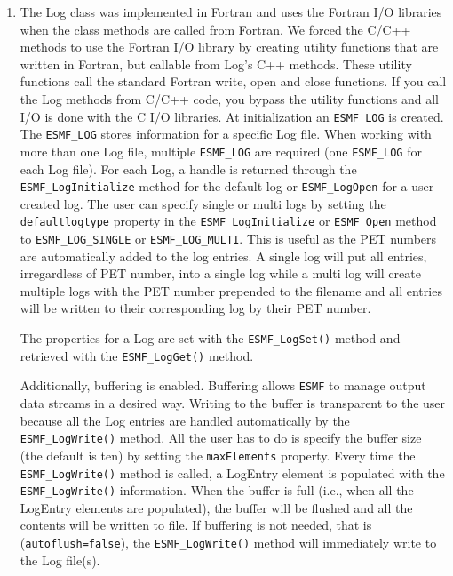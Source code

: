 %
\begin{enumerate}

\item The Log class was implemented in Fortran and uses the Fortran I/O 
libraries when the class methods are called from Fortran. We forced the C/C++
methods to use the Fortran I/O library by creating utility functions that are
written in Fortran, but callable from Log's C++ methods.  These utility 
functions call the standard Fortran write, open and close functions.  If you
call the Log methods from C/C++ code, you bypass the utility functions and 
all I/O is done with the C I/O libraries.
At initialization an {\tt ESMF\_LOG} is created.  The {\tt ESMF\_LOG} stores 
information for a specific Log file.   When working with more than one 
Log file, multiple {\tt ESMF\_LOG} are required (one {\tt ESMF\_LOG} for each 
Log file).  For each Log, a handle is returned through the 
{\tt ESMF\_LogInitialize} method for the default log or {\tt ESMF\_LogOpen} 
for a user created log.  The user can specify single or multi logs by setting
the {\tt defaultlogtype} property in the {\tt ESMF\_LogInitialize} or 
{\tt ESMF\_Open} method to {\tt ESMF\_LOG\_SINGLE} or {\tt ESMF\_LOG\_MULTI}.
This is useful as the PET numbers are automatically added to the log entries.
A single log will put all entries, irregardless of PET number, into a single
log while a multi log will create multiple logs with the PET number prepended
to the filename and all entries will be written to their corresponding log 
by their PET number.

The properties for a Log are set with the {\tt ESMF\_LogSet()} method and 
retrieved with the {\tt ESMF\_LogGet()} method.

Additionally, buffering is enabled.  Buffering allows {\tt ESMF} to manage 
output data streams in a desired way.  Writing to the buffer is transparent 
to the user because all the Log entries are handled automatically by the 
{\tt ESMF\_LogWrite()} method.  All the user has to do is specify the buffer
size (the default is ten) by setting the {\tt maxElements} property.  Every 
time the {\tt ESMF\_LogWrite()} method is called, a LogEntry element is 
populated with the {\tt ESMF\_LogWrite()} information.  When the buffer is 
full (i.e., when all the LogEntry elements are populated), the buffer will be 
flushed and all the contents will be written to file.  If buffering is not 
needed, that is ({\tt autoflush=false}), the {\tt ESMF\_LogWrite()} method 
will immediately write to the Log file(s).
\end{enumerate}




